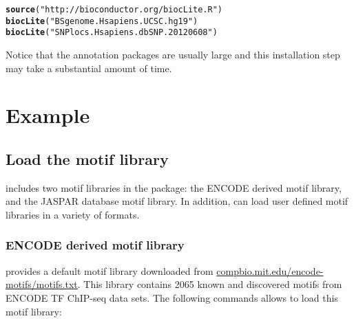 \documentclass[a4paper,10pt]{article}\usepackage[]{graphicx}\usepackage[]{color}
\makeatletter
\newcommand{\hlstr}[1]{\textcolor[rgb]{0.192,0.494,0.8}{#1}}%
\newcommand{\hlstd}[1]{\textcolor[rgb]{0.345,0.345,0.345}{#1}}%
\newcommand{\hlkwd}[1]{\textcolor[rgb]{0.737,0.353,0.396}{\textbf{#1}}}%
\newenvironment{kframe}{%
 \def\at@end@of@kframe{}%
 \ifinner\ifhmode%
  \def\at@end@of@kframe{\end{minipage}}%
  \begin{minipage}{\columnwidth}%
 \fi\fi%
 \def\FrameCommand##1{\hskip\@totalleftmargin \hskip-\fboxsep
 \colorbox{shadecolor}{##1}\hskip-\fboxsep
     \hskip-\linewidth \hskip-\@totalleftmargin \hskip\columnwidth}%
 \MakeFramed {\advance\hsize-\width
   \@totalleftmargin\z@ \linewidth\hsize
   \@setminipage}}%
 {\par\unskip\endMakeFramed%
 \at@end@of@kframe}
\newenvironment{knitrout}{}{} %
\makeatother
\begin{document}
\begin{knitrout}
\color{fgcolor}\begin{kframe}
\begin{alltt}
  \hlkwd{source}\hlstd{(}\hlstr{"http://bioconductor.org/biocLite.R"}\hlstd{)}
  \hlkwd{biocLite}\hlstd{(}\hlstr{"BSgenome.Hsapiens.UCSC.hg19"}\hlstd{)}
  \hlkwd{biocLite}\hlstd{(}\hlstr{"SNPlocs.Hsapiens.dbSNP.20120608"}\hlstd{)}
\end{alltt}
\end{kframe}
\end{knitrout}




Notice that the annotation packages are usually large and this installation step may take a substantial amount of time.


\section{Example}

\subsection{Load the motif library}

 includes two motif libraries in the package: the ENCODE derived motif library, and the JASPAR database motif library. In addition,  can load user defined motif libraries in a variety of formats.

\subsubsection{ENCODE derived motif library}

 provides a default motif library downloaded from \url{compbio.mit.edu/encode-motifs/motifs.txt}. This library contains 2065 known and discovered motifs from ENCODE TF ChIP-seq data sets. The following commands allows to load this motif library:
\end{document}
